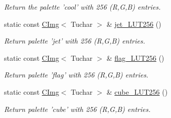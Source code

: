 \begin{DoxyCompactItemize}
\begin{DoxyCompactList}\small\item\em Return the palette 'cool' with 256 (R,G,B) entries. \item\end{DoxyCompactList}\item 
\hypertarget{structcimg__library_1_1CImg_a76c13fd3bea3ce0b0e81d2e74d1e4cf5}{
static const \hyperlink{structcimg__library_1_1CImg}{CImg}$<$ Tuchar $>$ \& \hyperlink{structcimg__library_1_1CImg_a76c13fd3bea3ce0b0e81d2e74d1e4cf5}{jet\_\-LUT256} ()}
\label{structcimg__library_1_1CImg_a76c13fd3bea3ce0b0e81d2e74d1e4cf5}

\begin{DoxyCompactList}\small\item\em Return palette 'jet' with 256 (R,G,B) entries. \item\end{DoxyCompactList}\item 
\hypertarget{structcimg__library_1_1CImg_a5ffda91a12d1a24f1c0140d1d290f831}{
static const \hyperlink{structcimg__library_1_1CImg}{CImg}$<$ Tuchar $>$ \& \hyperlink{structcimg__library_1_1CImg_a5ffda91a12d1a24f1c0140d1d290f831}{flag\_\-LUT256} ()}
\label{structcimg__library_1_1CImg_a5ffda91a12d1a24f1c0140d1d290f831}

\begin{DoxyCompactList}\small\item\em Return palette 'flag' with 256 (R,G,B) entries. \item\end{DoxyCompactList}\item 
\hypertarget{structcimg__library_1_1CImg_a6b0330376fae8d55b266c62d2bcdaa68}{
static const \hyperlink{structcimg__library_1_1CImg}{CImg}$<$ Tuchar $>$ \& \hyperlink{structcimg__library_1_1CImg_a6b0330376fae8d55b266c62d2bcdaa68}{cube\_\-LUT256} ()}
\label{structcimg__library_1_1CImg_a6b0330376fae8d55b266c62d2bcdaa68}

\begin{DoxyCompactList}\small\item\em Return palette 'cube' with 256 (R,G,B) entries. \item\end{DoxyCompactList}\end{DoxyCompactItemize}
